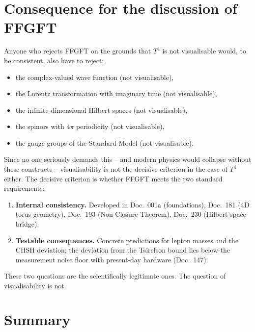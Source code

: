 \section{Consequence for the discussion of FFGFT}

Anyone who rejects FFGFT on the grounds that $T^4$ is not visualisable
would, to be consistent, also have to reject:
\begin{itemize}[leftmargin=2em,itemsep=2pt,topsep=2pt]
  \item the complex-valued wave function (not visualisable),
  \item the Lorentz transformation with imaginary time (not
        visualisable),
  \item the infinite-dimensional Hilbert spaces (not visualisable),
  \item the spinors with $4\pi$ periodicity (not visualisable),
  \item the gauge groups of the Standard Model (not visualisable).
\end{itemize}

Since no one seriously demands this -- and modern physics would
collapse without these constructs -- visualisability is not the
decisive criterion in the case of $T^4$ either. The decisive criterion
is whether FFGFT meets the two standard requirements:

\begin{enumerate}[leftmargin=2em,itemsep=2pt,topsep=2pt]
  \item \textbf{Internal consistency.} Developed in Doc.~001a
        (foundations), Doc.~181 (4D torus geometry), Doc.~193
        (Non-Closure Theorem), Doc.~230 (Hilbert-space bridge).
  \item \textbf{Testable consequences.} Concrete predictions for
        lepton masses and the CHSH deviation; the deviation from the
        Tsirelson bound lies below the measurement noise floor with
        present-day hardware (Doc.~147).
\end{enumerate}

These two questions are the scientifically legitimate ones. The
question of visualisability is not.

\section{Summary}

